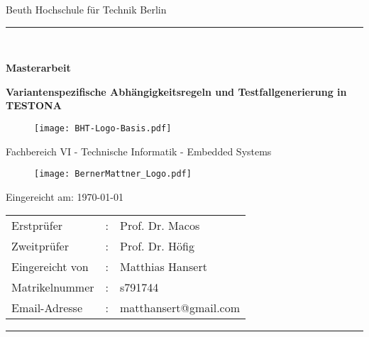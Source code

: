 \begin{titlepage}
	\begin{center}
		\Large
		Beuth Hochschule für Technik Berlin
		\textcolor{darkBHT}{\rule{\textwidth}{0.2cm}} \\
		\vspace{2 cm}
		
		\Large		
		\textbf{Masterarbeit}
		
		\huge
		\textbf{Variantenspezifische Abhängigkeitsregeln und Testfallgenerierung in TESTONA\\}

		\vspace{2cm}
		
		\begin{figure}[htbp]
			\centering 
			\texttt{[image: BHT-Logo-Basis.pdf]}  
		\end{figure}

\Large
Fachbereich VI - Technische Informatik - Embedded Systems
		
		\vspace{1cm}		

		\begin{figure}[htbp]
			\centering 
			\texttt{[image: BernerMattner\_Logo.pdf]}  
		\end{figure}		
		
		\vspace{1cm}
		
		\begin{center}
		Eingereicht am: \today
		\end{center}
		
		\begin{tabular}{lll}
			Erstprüfer    &: &Prof. Dr. Macos \\
			Zweitprüfer   &: &Prof. Dr. Höfig\\
			Eingereicht von&: &Matthias Hansert \\
			Matrikelnummer&:  &s791744\\
			Email-Adresse &: &matthansert@gmail.com\\
		\end{tabular}
		
		\date{\today}
		
	\end{center}
	\vfill
	\textcolor{darkBHT}{\rule{\textwidth}{0.2cm}}
	\normalsize
	
	\newpage
\end{titlepage}